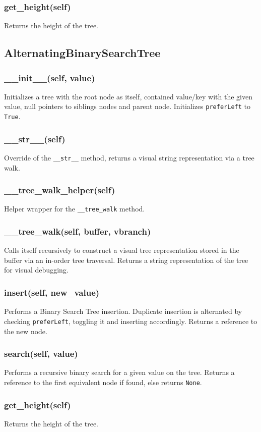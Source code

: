 \documentclass[fleqn,10pt]{SelfArx} %
\begin{document}
\subsubsection*{get\_height(self)}
Returns the height of the tree.

\subsection*{AlternatingBinarySearchTree}
\subsubsection*{\_\_init\_\_(self, value)}
Initializes a tree with the root node as itself, contained value/key with the given value, null pointers to siblings nodes and parent node. Initializes \texttt{preferLeft} to \texttt{True}.
\subsubsection*{\_\_str\_\_(self)}
Override of the \texttt{\_\_str\_\_} method, returns a visual string representation via a tree walk.
\subsubsection*{\_\_tree\_walk\_helper(self)}
Helper wrapper for the \texttt{\_\_tree\_walk} method.
\subsubsection*{\_\_tree\_walk(self, buffer, vbranch)}
Calls itself recursively to construct a visual tree representation stored in the buffer via an in-order tree traversal. Returns a string representation of the tree for visual debugging.
\subsubsection*{insert(self, new\_value)}
Performs a Binary Search Tree insertion. Duplicate insertion is alternated by checking \texttt{preferLeft}, toggling it and inserting accordingly. Returns a reference to the new node.
\subsubsection*{search(self, value)}
Performs a recursive binary search for a given value on the tree. Returns a reference to the first equivalent node if found, else returns \texttt{None}.
\subsubsection*{get\_height(self)}
Returns the height of the tree.
\end{document}

